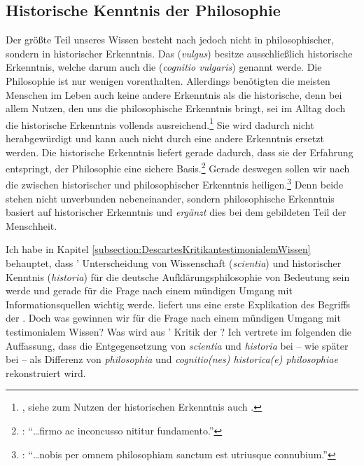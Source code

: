 \subsection{Historische Kenntnis der
Philosophie}\label{subsubsection:HistorischeKenntnisDerPhilosophie}
Der größte Teil unseres Wissen besteht nach
 jedoch nicht in philosophischer,
sondern in historischer Erkenntnis.
Das  (\emph{vulgus}) besitze ausschließlich historische
Erkenntnis, welche darum auch die 
(\emph{cognitio vulgaris}) genannt werde. Die Philosophie ist nur wenigen
vorenthalten. Allerdings benötigten die meisten Menschen im Leben auch keine
andere Erkenntnis als die historische, denn bei allem Nutzen, den uns die
philosophische Erkenntnis bringt, sei im Alltag doch die historische Erkenntnis
vollends
ausreichend.\footnote{\cite[Vgl.][\S~23]{Wolff:Discursuspraeliminarisdephilosophiaingenere1996},
siehe zum Nutzen der historischen Erkenntnis auch
\cite[][\S~13]{Wolff:Discursuspraeliminarisdephilosophiaingenere1996}.} Sie wird
dadurch nicht herabgewürdigt und kann auch nicht durch eine andere
Erkenntnis ersetzt werden. Die historische Erkenntnis liefert gerade dadurch,
dass sie der Erfahrung entspringt, der Philosophie eine sichere
Basis.\footnote{\cite[Vgl.][\S~11]{Wolff:Discursuspraeliminarisdephilosophiaingenere1996}:
\enquote{\dots\unkern firmo ac inconcusso nititur fundamento.}} Gerade deswegen
sollen wir nach  die 
zwischen historischer und philosophischer Erkenntnis
heiligen.\footnote{\cite[Vgl.][\S~12]{Wolff:Discursuspraeliminarisdephilosophiaingenere1996}:
\enquote{\dots\unkern{}nobis per omnem philosophiam sanctum est utriusque
connubium.}} Denn beide stehen nicht unverbunden nebeneinander, sondern
philosophische Erkenntnis basiert auf historischer Erkenntnis und \emph{ergänzt}
dies bei dem gebildeten Teil der Menschheit.

Ich habe in Kapitel \ref{subsection:DescartesKritikantestimonialemWissen}
behauptet, dass ' Unterscheidung
von Wissenschaft (\emph{scientia}) und historischer Kenntnis (\emph{historia})
für die deutsche Aufklärungsphilosophie von Bedeutung sein werde und gerade für
die Frage nach einem mündigen Umgang mit Informationsquellen wichtig werde.
 liefert uns
eine erste Explikation des Begriffs der .
Doch was gewinnen wir für die Frage nach einem mündigen Umgang mit
testimonialem Wissen? Was wird aus
' Kritik der
? Ich vertrete im folgenden die Auffassung,
dass die Entgegensetzung von \emph{scientia} und \emph{historia} bei
 -- wie später
bei  -- als Differenz von \emph{philosophia} und
\emph{cognitio(nes) historica(e) philosophiae} rekonstruiert wird.

